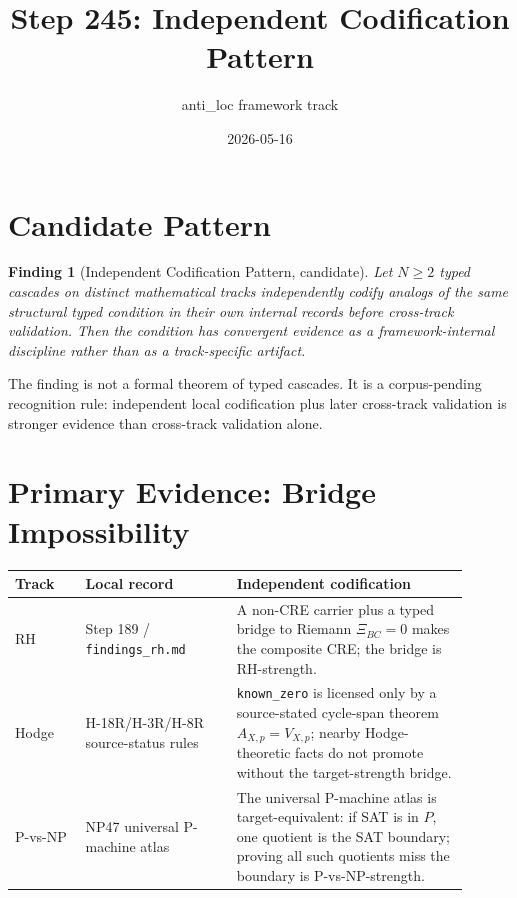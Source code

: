 \documentclass[11pt]{article}
\title{Step 245: Independent Codification Pattern}
\author{anti\_loc framework track}
\date{2026-05-16}
\newtheorem{finding}{Finding}
\begin{document}
\maketitle

\section{Candidate Pattern}

\begin{finding}[Independent Codification Pattern, candidate]
Let \(N \ge 2\) typed cascades on distinct mathematical tracks independently codify analogs of the same structural typed condition in their own internal records before cross-track validation. Then the condition has convergent evidence as a framework-internal discipline rather than as a track-specific artifact.
\end{finding}

The finding is not a formal theorem of typed cascades. It is a corpus-pending recognition rule: independent local codification plus later cross-track validation is stronger evidence than cross-track validation alone.

\section{Primary Evidence: Bridge Impossibility}

\begin{center}
\begin{tabular}{p{0.14\linewidth}p{0.30\linewidth}p{0.46\linewidth}}
\toprule
Track & Local record & Independent codification \\
\midrule
RH & Step 189 / \texttt{findings\_rh.md} & A non-CRE carrier plus a typed bridge to Riemann \(\Xi_{BC}=0\) makes the composite CRE; the bridge is RH-strength. \\
Hodge & H-18R/H-3R/H-8R source-status rules & \texttt{known\_zero} is licensed only by a source-stated cycle-span theorem \(A_{X,p}=V_{X,p}\); nearby Hodge-theoretic facts do not promote without the target-strength bridge. \\
P-vs-NP & NP47 universal P-machine atlas & The universal P-machine atlas is target-equivalent: if SAT is in \(P\), one quotient is the SAT boundary; proving all such quotients miss the boundary is P-vs-NP-strength. \\
\bottomrule
\end{tabular}
\end{center}
\end{document}
